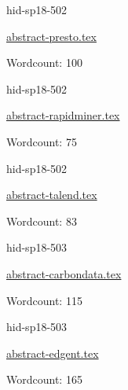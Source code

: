 

\begin{IU}

hid-sp18-502

\href{https://github.com/cloudmesh-community/hid-sp18-502/blob/master//technology/abstract-presto.tex}{abstract-presto.tex}

 

Wordcount: 100

\end{IU}



\begin{IU}

hid-sp18-502

\href{https://github.com/cloudmesh-community/hid-sp18-502/blob/master//technology/abstract-rapidminer.tex}{abstract-rapidminer.tex}

 

Wordcount: 75

\end{IU}



\begin{IU}

hid-sp18-502

\href{https://github.com/cloudmesh-community/hid-sp18-502/blob/master//technology/abstract-talend.tex}{abstract-talend.tex}

 

Wordcount: 83

\end{IU}



\begin{IU}

hid-sp18-503

\href{https://github.com/cloudmesh-community/hid-sp18-503/blob/master//technology/abstract-carbondata.tex}{abstract-carbondata.tex}

 

Wordcount: 115

\end{IU}



\begin{IU}

hid-sp18-503

\href{https://github.com/cloudmesh-community/hid-sp18-503/blob/master//technology/abstract-edgent.tex}{abstract-edgent.tex}

 

Wordcount: 165

\end{IU}

